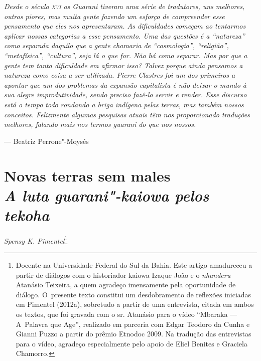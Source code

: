 \begin{flushright}
\begin{minipage}[c]{0.85\textwidth}
\raggedleft
\footnotesize
\emph{Desde o século \textsc{xvi} os Guarani tiveram uma série de tradutores, uns
melhores, outros piores, mas muita gente fazendo um esforço de
compreender esse pensamento que eles nos apresentaram. As dificuldades
começam ao tentarmos aplicar nossas categorias a esse pensamento. Uma
das questões é a ``natureza'' como separada daquilo que a gente chamaria de
``cosmologia'', ``religião'', ``metafísica'', ``cultura'', seja lá o que for. Não há
como separar. Mas por que a gente tem tanta dificuldade em afirmar
isso? Talvez porque ainda pensamos a natureza como coisa a ser
utilizada. Pierre Clastres foi um dos primeiros a apontar que um dos
problemas da expansão capitalista é não deixar o mundo à sua alegre
improdutividade, sendo preciso fazê-lo servir e render. Esse discurso
está o tempo todo rondando a briga indígena pelas terras, mas também
nossos conceitos. Felizmente algumas pesquisas atuais têm nos
proporcionado traduções melhores, falando mais nos termos guarani do
que nos nossos.}

\smallskip
\hspace*{\fill}--- Beatriz Perrone"-Moysés
\end{minipage}
\end{flushright}

\thispagestyle{empty}

\chapter*{Novas terras sem males\\
\large{\emph{A luta guarani"-kaiowa pelos \emph{tekoha}}}}


\begin{flushright}
\emph{Spensy K. Pimentel}\footnote{Docente na Universidade Federal do Sul da
Bahia. Este artigo amadureceu a partir de diálogos com o historiador
kaiowa Izaque João e o \emph{nhanderu} Atanásio Teixeira, a quem agradeço
imensamente pela oportunidade de diálogo. O~presente texto constitui um
desdobramento de reflexões iniciadas em Pimentel (2012a), sobretudo a
partir de uma entrevista, citada em ambos os textos, que foi gravada
com o sr. Atanásio para o vídeo ``Mbaraka --- A~Palavra que Age'',
realizado em parceria com Edgar Teodoro da Cunha e Gianni Puzzo a
partir do prêmio Etnodoc 2009. Na tradução das entrevistas para o
vídeo, agradeço especialmente pelo apoio de Eliel Benites e Graciela
Chamorro.} 
\end{flushright}

